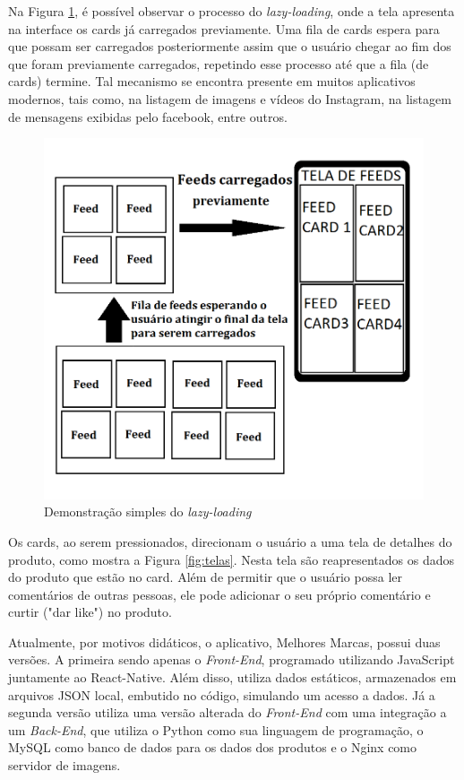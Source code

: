 \documentclass[12pt]{article}
\begin{document}
Na Figura \ref{fig:feeds}, é possível observar o processo do \textit{lazy-loading}, onde a tela apresenta na interface os cards já carregados previamente. Uma fila de cards espera para que possam ser carregados posteriormente assim que o usuário chegar ao fim dos que foram previamente carregados, repetindo esse processo até que a fila (de cards) termine. Tal mecanismo se encontra presente em muitos aplicativos modernos, tais como, na listagem de imagens e vídeos do Instagram, na listagem de mensagens exibidas pelo facebook, entre outros.

\begin{figure}[ht!]
\centering
\includegraphics[width=.8\textwidth]{imagens/feeds.png}
\caption{Demonstração simples do \textit{lazy-loading}}
\label{fig:feeds}
\end{figure}

Os cards, ao serem pressionados, direcionam o usuário a uma tela de detalhes do produto, como mostra a Figura \ref{fig:telas}. Nesta tela são reapresentados os dados do produto que estão no card. Além de permitir que o usuário possa ler comentários de outras pessoas, ele pode adicionar o seu próprio comentário e curtir ("dar like") no produto. 

Atualmente, por motivos didáticos, o aplicativo, Melhores Marcas, possui duas versões. A primeira sendo apenas o \textit{Front-End}, programado utilizando JavaScript juntamente ao React-Native. Além disso, utiliza dados estáticos, armazenados em arquivos JSON local, embutido no código, simulando um acesso a dados. Já a segunda versão utiliza uma versão alterada do \textit{Front-End} com uma integração a um \textit{Back-End}, que utiliza o Python como sua linguagem de programação, o MySQL como banco de dados para os dados dos produtos e o Nginx como servidor de imagens.
\end{document}
